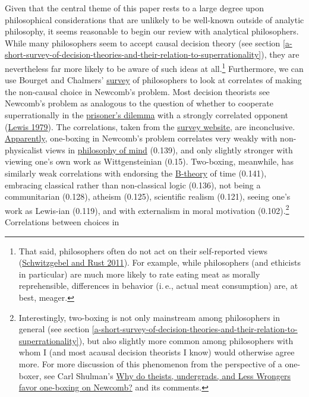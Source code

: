 Given that the central theme of this paper rests to a large degree upon
philosophical considerations that are unlikely to be well-known outside
of analytic philosophy, it seems reasonable to begin our review with
analytical philosophers. While many philosophers seem to accept causal
decision theory (see section
\ref{a-short-survey-of-decision-theories-and-their-relation-to-superrationality}), they are nevertheless far more likely to be aware
of such ideas at all.\footnote{That said, philosophers often do not act
  on their self-reported views
  (\href{http://www.faculty.ucr.edu/~eschwitz/SchwitzAbs/EthSelfRep.htm}{Schwitzgebel
  and Rust 2011}). For example, while philosophers (and ethicists in
  particular) are much more likely to rate eating meat as morally
  reprehensible, differences in behavior (i.\,e., actual meat consumption)
  are, at best, meager.} Furthermore, we can use Bourget and Chalmers'
\href{http://philpapers.org/archive/BOUWDP}{survey} of
philosophers to look at correlates of making the non-causal choice in
Newcomb's problem. Most decision theorists see Newcomb's problem as
analogous to the question of whether to cooperate superrationally in the
\href{https://en.wikipedia.org/wiki/Prisoner\%27s_dilemma}{prisoner's
dilemma} with a strongly correlated opponent
(\href{https://sl4librarian.files.wordpress.com/2017/01/lewis-prisoners-dilemma-newcomb-problem.pdf}{Lewis
1979}). The correlations, taken from the
\href{http://philpapers.org/surveys}{survey website}, are
inconclusive.
\href{http://philpapers.org/surveys/linear_most.pl}{Apparently},
one-boxing in Newcomb's problem correlates very weakly with
non-physicalist views in
\href{https://en.wikipedia.org/wiki/Philosophy_of_mind}{philosophy
of mind} (0.139), and only slightly stronger with viewing one's own
work as Wittgensteinian (0.15). Two-boxing, meanwhile, has similarly
weak correlations with endorsing the
\href{https://en.wikipedia.org/wiki/B-theory_of_time}{B-theory}
of time (0.141), embracing classical rather than non-classical logic
(0.136), not being a communitarian (0.128), atheism (0.125), scientific
realism (0.121), seeing one's work as Lewis-ian (0.119), and with
externalism in moral motivation (0.102).\footnote{Interestingly,
  two-boxing is not only mainstream among philosophers in general (see
  section
  \ref{a-short-survey-of-decision-theories-and-their-relation-to-superrationality}), but also slightly more common among
  philosophers with whom I (and most acausal decision theorists I know)
  would otherwise agree more. For more discussion of this phenomenon
  from the perspective of a one-boxer, see Carl Shulman's
  \href{http://lesswrong.com/lw/hqs/why_do_theists_undergrads_and_less_wrongers_favor/}{Why
  do theists, undergrads, and Less Wrongers favor one-boxing on
  Newcomb?} and its comments.} Correlations between choices in
